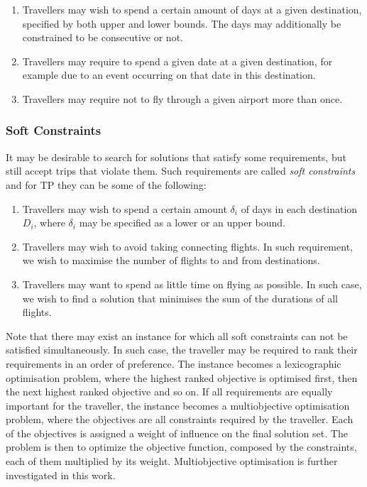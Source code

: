\documentclass{mpaper}
\begin{document}
\begin{enumerate}[topsep=0.1em]
\setlength\itemsep{0.1em}
\item Travellers may wish to spend a certain amount of days at a given destination, specified by both upper and lower bounds. The days may additionally be constrained to be consecutive or not.

\item Travellers may require to spend a given date at a given destination, for example due to an event occurring on that date in this destination.

\item Travellers may require not to fly through a given airport more than once.
\end{enumerate}

\subsubsection*{Soft Constraints}
\label{subsec:softconstraints}
It may be desirable to search for solutions that satisfy some requirements, but still accept trips that violate them. Such requirements are called \textit{soft constraints} and for TP they can be some of the following:

\begin{enumerate}[topsep=0.1em]
\setlength\itemsep{0.1em}
\item Travellers may wish to spend a certain amount $\delta_{i}$ of days in each destination $D_{i}$, where $\delta_{i}$ may be specified as a lower or an upper bound.

\item Travellers may wish to avoid taking connecting flights. In such requirement, we wish to maximise the number of flights to and from destinations.

\item Travellers may want to spend as little time on flying as possible. In such case, we wish to find a solution that minimises the sum of the durations of all flights.
\end{enumerate}

Note that there may exist an instance for which all soft constraints can not be satisfied simultaneously. In such case, the traveller may be required to rank their requirements in an order of preference. The instance becomes a lexicographic optimisation problem, where the highest ranked objective is optimised first, then the next highest ranked objective and so on. If all requirements are equally important for the traveller, the instance becomes a multiobjective optimisation problem, where the objectives are all constraints required by the traveller. Each of the objectives is assigned a weight of influence on the final solution set. The problem is then to optimize the objective function, composed by the constraints, each of them multiplied by its weight. Multiobjective optimisation is further investigated in this work.
\end{document}
